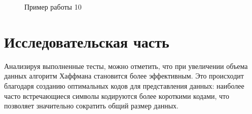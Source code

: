 \documentclass[12pt, a4paper]{article}
\begin{document}
\begin{enumerate}
\begin{figure}[h]
  		\caption{Пример работы 10}
  		\label{img:grap10}
	\end{figure}
\end{enumerate}
\newpage
\section{Исследовательская часть}
Анализируя выполненные тесты, можно отметить, что при увеличении объема данных 
алгоритм Хаффмана становится более эффективным. Это происходит благодаря 
созданию оптимальных кодов для 
представления данных: наиболее часто встречающиеся символы кодируются более 
короткими кодами, что позволяет значительно сократить общий размер данных.
\end{document}
